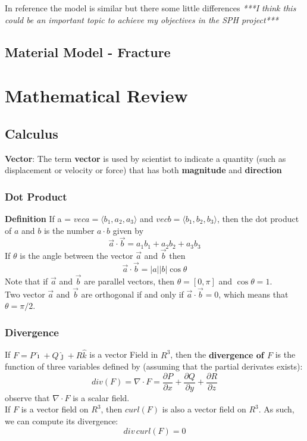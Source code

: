 \documentclass[10pt, twocolumn]{thesis}
\begin{document}
\begin{scriptsize}
In reference \cite{allahdadi93} the model is similar but there some little differences
\textit{***I think this could be an important topic to achieve my objectives in the SPH project***}
\end{scriptsize}
\chapter{Material Model - Fracture}


\part{Mathematical Review}
\chapter{Calculus}
\textbf{Vector}: The term \textbf{vector} is used by scientist to indicate a quantity (such as displacement or velocity or force) that has both \textbf{magnitude} and \textbf{direction}\cite{S_calculus}
\section{Dot Product}
\textbf{Definition} If a = $vec{a}=\langle b_1,a_2,a_3\rangle$ and $vec{b}=\langle b_1,b_2,b_3\rangle$, then the dot product of $a$ and $b$ is the number $a\cdot b$ given by
\[\vec{a}\cdot\vec{b}=a_1b_1+a_2b_2+a_3b_3\]
If $\theta$ is the angle between the vector $\vec{a}$ and $\vec{b}$ then
\[\vec{a}\cdot\vec{b}=|a||b|\cos{\theta}\]
Note that if $\vec{a}$ and $\vec{b}$ are parallel vectors, then $\theta=[0, \pi]$ and $\cos{\theta}=1$.\\
Two vector $\vec{a}$ and $\vec{b}$ are orthogonal if and only if $\vec{a}\cdot\vec{b}=0$, which means that $\theta=\pi/2$.
\section{Divergence}
If $F=P\hat{\imath}+Q\hat{\jmath}+R\hat{k}$ is a vector Field in $R^3$, then the \textbf{divergence of $F$} is the function of three variables defined by (assuming that the partial derivates exists):
\[div(F)=\nabla\cdot F=\frac{\partial P}{\partial x}+\frac{\partial Q}{\partial y}+\frac{\partial R}{\partial z}\]
observe that $\nabla\cdot F$ is a scalar field.\\
If $F$ is a vector field on $R^3$, then $curl(F)$ is also a vector field on $R^3$. As such, we can compute its divergence:
\[div\,curl(F)=0\]
\end{document}
